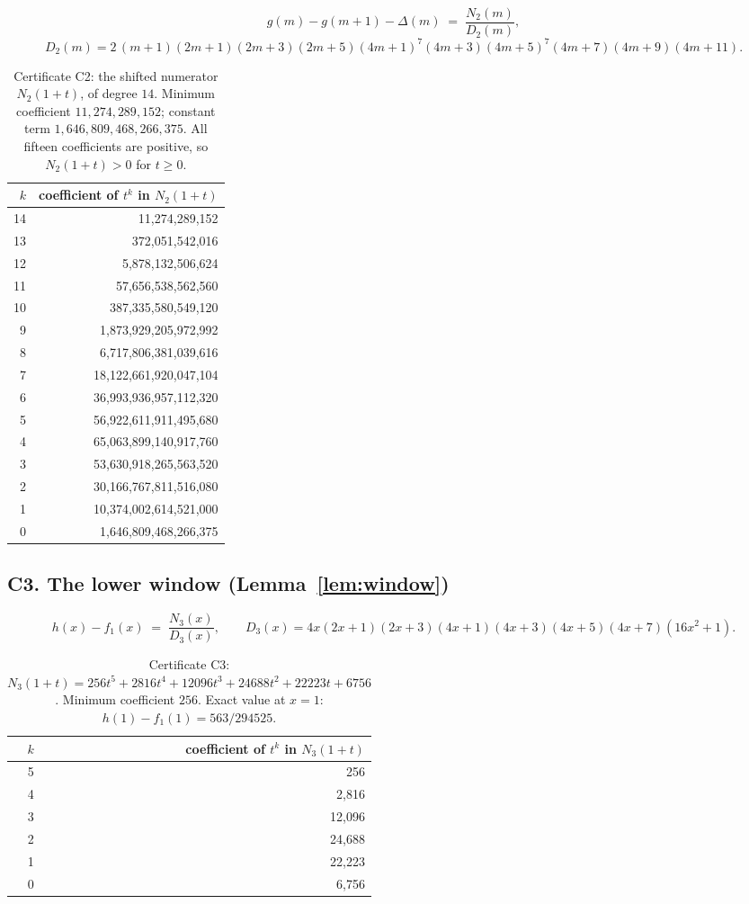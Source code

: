 \documentclass[11pt]{article}
\theoremstyle{plain}
\theoremstyle{definition}
\theoremstyle{remark}
\numberwithin{equation}{section}
\begin{document}
\[
  g(m) - g(m+1) - \Delta(m) \;=\; \frac{N_2(m)}{D_2(m)},
\]
\[
  D_2(m) = 2\,(m+1)(2m+1)(2m+3)(2m+5)(4m+1)^7(4m+3)(4m+5)^7(4m+7)(4m+9)(4m+11).
\]

\begin{table}[ht]
\centering
\begin{tabular}{@{}rr@{}}
\toprule
$k$ & coefficient of $t^k$ in $N_2(1+t)$ \\
\midrule
14 & 11{,}274{,}289{,}152 \\
13 & 372{,}051{,}542{,}016 \\
12 & 5{,}878{,}132{,}506{,}624 \\
11 & 57{,}656{,}538{,}562{,}560 \\
10 & 387{,}335{,}580{,}549{,}120 \\
 9 & 1{,}873{,}929{,}205{,}972{,}992 \\
 8 & 6{,}717{,}806{,}381{,}039{,}616 \\
 7 & 18{,}122{,}661{,}920{,}047{,}104 \\
 6 & 36{,}993{,}936{,}957{,}112{,}320 \\
 5 & 56{,}922{,}611{,}911{,}495{,}680 \\
 4 & 65{,}063{,}899{,}140{,}917{,}760 \\
 3 & 53{,}630{,}918{,}265{,}563{,}520 \\
 2 & 30{,}166{,}767{,}811{,}516{,}080 \\
 1 & 10{,}374{,}002{,}614{,}521{,}000 \\
 0 & 1{,}646{,}809{,}468{,}266{,}375 \\
\bottomrule
\end{tabular}
\caption{Certificate C2: the shifted numerator $N_2(1+t)$, of degree $14$. Minimum coefficient
$11{,}274{,}289{,}152$; constant term $1{,}646{,}809{,}468{,}266{,}375$. All fifteen coefficients
are positive, so $N_2(1+t) > 0$ for $t \ge 0$.}
\label{tab:C2}
\end{table}

\subsection*{C3. The lower window (Lemma~\ref{lem:window})}

\[
  h(x) - f_1(x) \;=\; \frac{N_3(x)}{D_3(x)},
  \qquad
  D_3(x) = 4x(2x+1)(2x+3)(4x+1)(4x+3)(4x+5)(4x+7)(16x^2+1).
\]

\begin{table}[ht]
\centering
\begin{tabular}{@{}rr@{}}
\toprule
$k$ & coefficient of $t^k$ in $N_3(1+t)$ \\
\midrule
5 & 256 \\
4 & 2{,}816 \\
3 & 12{,}096 \\
2 & 24{,}688 \\
1 & 22{,}223 \\
0 & 6{,}756 \\
\bottomrule
\end{tabular}
\caption{Certificate C3: $N_3(1+t) = 256t^5 + 2816t^4 + 12096t^3 + 24688t^2 + 22223t + 6756$.
Minimum coefficient $256$. Exact value at $x=1$: $h(1)-f_1(1) = 563/294525$.}
\label{tab:C3}
\end{table}
\end{document}
